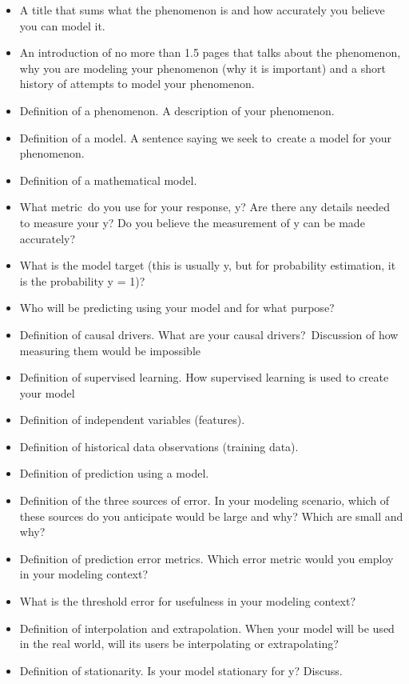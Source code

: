 \documentclass[12pt]{article}
\begin{document}
\begin{itemize}
\item A title that sums what the phenomenon is and how accurately you believe you can model it.
\item An introduction of no more than 1.5 pages that talks about the phenomenon, why you are modeling your phenomenon (why it is important) and a short history of attempts to model your phenomenon. 


\item Definition of a phenomenon. A description of your phenomenon. 
\item Definition of a model. A sentence saying we seek to create a model for your phenomenon.
\item Definition of a mathematical model.
\item What metric do you use for your response, y? Are there any details needed to measure your y? Do you believe the measurement of y can be made accurately?
\item What is the model target (this is usually y, but for probability estimation, it is the probability y = 1)?
\item Who will be predicting using your model and for what purpose?
\item Definition of causal drivers. What are your causal drivers? Discussion of how measuring them would be impossible
\item Definition of supervised learning. How supervised learning is used to create your model
\item Definition of independent variables (features).
\item Definition of historical data observations (training data).
\item Definition of prediction using a model.
\item Definition of the three sources of error. In your modeling scenario, which of these sources do you anticipate would be large and why? Which are small and why?
\item Definition of prediction error metrics. Which error metric would you employ in your modeling context?
\item What is the threshold error for usefulness in your modeling context?
\item Definition of interpolation and extrapolation. When your model will be used in the real world, will its users be interpolating or extrapolating?
\item Definition of stationarity. Is your model stationary for y? Discuss.

\end{itemize}
\end{document}
